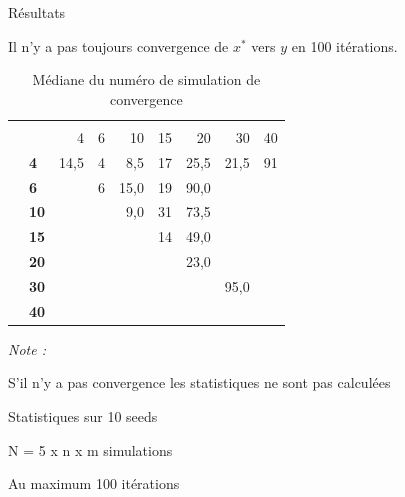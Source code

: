 \documentclass[10pt,xcolor=table,color={dvipsnames,usenames},ignorenonframetext,usepdftitle=false,french]{beamer}
\begin{document}
\begin{frame}{Résultats}
\protect\hypertarget{ruxe9sultats-9}{}

Il n'y a pas toujours convergence de \(x^*\) vers \(y\) en 100
itérations.

\begin{table}

\caption{\label{tab:tabq3convmed}Médiane du numéro de simulation de convergence}
\centering
\begin{threeparttable}
\begin{tabular}[t]{>{\bfseries}l|>{\bfseries}l|r|r|r|r|r|r|r}
\hline
\multicolumn{2}{c|}{ } & \multicolumn{7}{c}{m} \\
\cline{3-9}
  &    & 4 & 6 & 10 & 15 & 20 & 30 & 40\\
\hline
 & 4 & 14,5 & 4 & 8,5 & 17 & 25,5 & 21,5 & 91\\
\cline{2-9}
 & 6 &  & 6 & 15,0 & 19 & 90,0 &  & \\
\cline{2-9}
 & 10 &  &  & 9,0 & 31 & 73,5 &  & \\
\cline{2-9}
 & 15 &  &  &  & 14 & 49,0 &  & \\
\cline{2-9}
 & 20 &  &  &  &  & 23,0 &  & \\
\cline{2-9}
 & 30 &  &  &  &  &  & 95,0 & \\
\cline{2-9}
\multirow{-7}{*}{\raggedright\arraybackslash n} & 40 &  &  &  &  &  &  & \\
\hline
\end{tabular}
\begin{tablenotes}
\item \textit{Note : } 
\item S'il n'y a pas convergence les statistiques ne sont pas calculées
\item Statistiques sur 10 seeds
\item N = 5 x n x m simulations
\item Au maximum 100 itérations
\end{tablenotes}
\end{threeparttable}
\end{table}

\end{frame}
\end{document}
